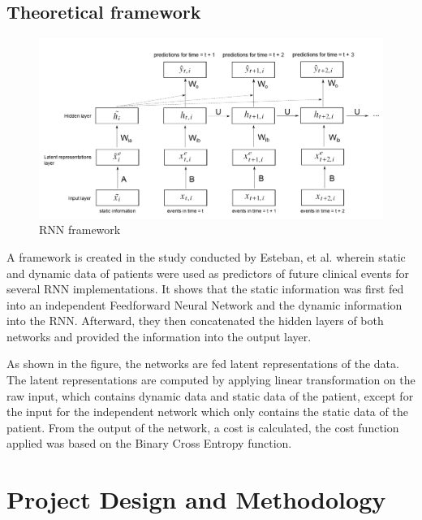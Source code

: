 ﻿\documentclass[10pt,11pt,12pt,oneside]{book}
\begin{document}
    \section{Theoretical framework}
    \begin{figure} [ht]
        \includegraphics[width=6.5in]{rnnframework.png}
        \caption{RNN framework}
        \medskip
    \end{figure}
    A framework is created in the study conducted by Esteban, et al. wherein static and dynamic data of patients were used as predictors of future clinical events for several RNN implementations. It shows that the static information was first fed into an independent Feedforward Neural Network and the dynamic information into the RNN. Afterward, they then concatenated the hidden layers of both networks and provided the information into the output layer.

    As shown in the figure, the networks are fed latent representations of the data. The latent representations are computed by applying linear transformation on the raw input, which contains dynamic data and static data of the patient, except for the input for the independent network which only contains the static data of the patient. From the output of the network, a cost is calculated, the cost function applied was based on the Binary Cross Entropy function. \cite{DBLP:journals/corr/EstebanSYT16}
    \FloatBarrier
\chapter{Project Design and Methodology}
\end{document}
